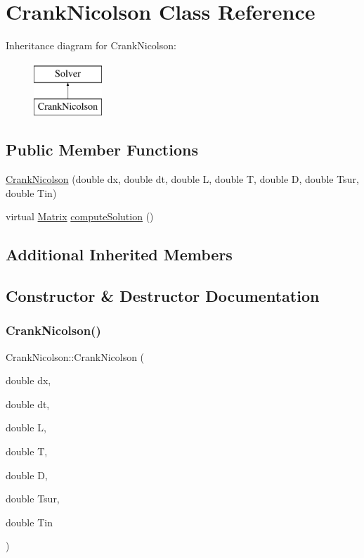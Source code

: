 \hypertarget{classCrankNicolson}{}\section{Crank\+Nicolson Class Reference}
\label{classCrankNicolson}
Inheritance diagram for Crank\+Nicolson\+:\begin{figure}[H]
\begin{center}
\leavevmode
\includegraphics[height=2.000000cm]{classCrankNicolson}
\end{center}
\end{figure}
\subsection*{Public Member Functions}
\begin{DoxyCompactItemize}
\item 
\mbox{\hyperlink{classCrankNicolson_a722060b8060158412b131179a1c484ce}{Crank\+Nicolson}} (double dx, double dt, double L, double T, double D, double Tsur, double Tin)
\item 
virtual \mbox{\hyperlink{classMatrix}{Matrix}} \mbox{\hyperlink{classCrankNicolson_a94af3b8a56ef40966ea2ccd2629c2eb2}{compute\+Solution}} ()
\end{DoxyCompactItemize}
\subsection*{Additional Inherited Members}


\subsection{Constructor \& Destructor Documentation}
\mbox{\label{classCrankNicolson_a722060b8060158412b131179a1c484ce}} 
\subsubsection{\texorpdfstring{Crank\+Nicolson()}{CrankNicolson()}}
{\footnotesize\ttfamily Crank\+Nicolson\+::\+Crank\+Nicolson (\begin{DoxyParamCaption}\item[{double}]{dx,  }\item[{double}]{dt,  }\item[{double}]{L,  }\item[{double}]{T,  }\item[{double}]{D,  }\item[{double}]{Tsur,  }\item[{double}]{Tin }\end{DoxyParamCaption})}

